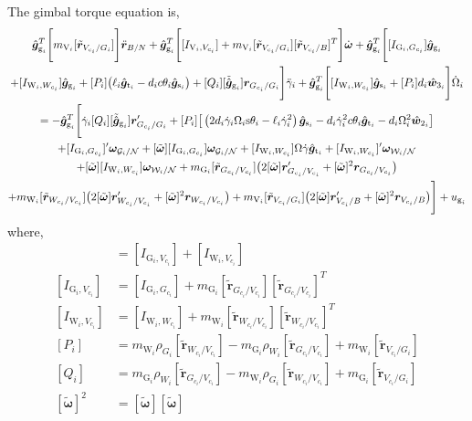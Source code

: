 The gimbal torque equation is,
\begin{multline}
\hat{\bm g}_{\text{g}_i}^T \Bigg[ m_{\text{V}_i}[\tilde{\bm r}_{V_{c_i}/G_i}] \Bigg] \ddot{\bm r}_{B/N}
+ \hat{\bm g}_{\text{g}_i}^T \Bigg[ [I_{\text{V}_i,V_{c_i}}] + m_{\text{V}_i}[\tilde{\bm r}_{V_{c_i}/G_i}][\tilde{\bm{r}}_{V_{c_i}/B}]^T \Bigg] \dot{\bm{\omega}}
+ \hat{\bm g}_{\text{g}_i}^T \Bigg[ [I_{\text{G}_i,G_{c_i}}]\hat{\bm{g}}_{\text{g}_i} \\+ [I_{\text{W}_i,W_{c_i}}]\hat{\bm{g}}_{\text{g}_i} + [P_i] \big(\ell_i\hat{\bm{g}}_{\text{t}_i} - d_ic\theta_i\hat{\bm{g}}_{\text{s}_i}\big) + [Q_i] [\tilde{\hat{\bm g}}_{\text{g}_i}]\bm{r}_{G_{c_i}/G_i} \Bigg] \ddot{\gamma}_i
+ \hat{\bm g}_{\text{g}_i}^T \Bigg[ [I_{\text{W}_i,W_{c_i}}]\hat{\bm{g}}_{\text{s}_i} + [P_i] d_i\hat{\bm w}_{3_i} \Bigg] \dot{\Omega}_i
\\ = - \hat{\bm g}_{\text{g}_i}^T \Bigg[ \dot{\gamma}_i[Q_i][\tilde{\hat{\bm g}}_{\text{g}_i}]\bm{r}'_{G_{c_i}/G_i} + [P_i] \big[\left(2d_i\dot{\gamma}_i\Omega_i\text{s}\theta_i - \ell_i\dot{\gamma}_i^2\right)\hat{\bm{g}}_{\text{s}_i} - d_i\dot{\gamma}_i^2c\theta_i\hat{\bm{g}}_{\text{t}_i} - d_i\Omega_i^2 \hat{\bm{w}}_{2_i}\big]
\\+[I_{\text{G}_i,G_{c_i}}]'\bm\omega_{\mathcal{G}_i/\cal N} + [\tilde{\bm\omega}][I_{\text{G}_i,G_{c_i}}]\bm\omega_{\mathcal{G}_i/\cal N} + [I_{\text{W}_i,W_{c_i}}]\Omega\dot{\gamma}\hat{\bm{g}}_{\text{t}_i} + [I_{\text{W}_i,W_{c_i}}]'\bm\omega_{\mathcal{W}_i/\cal N} \\+ [\tilde{\bm{\omega}}][I_{\text{W}_i,W_{c_i}}]\bm\omega_{\mathcal{W}_i/\cal N}
+ m_{\text{G}_i}[\tilde{\bm{r}}_{G_{c_i}/V_{c_i}}] \big( 2[\tilde{\bm\omega}]\bm{r}'_{G_{c_i}/V_{c_i}} + [\tilde{\bm\omega}]^2\bm{r}_{G_{c_i}/V_{c_i}}\big)
\\ + m_{\text{W}_i}[\tilde{\bm{r}}_{W_{c_i}/V_{c_i}}]\big( 2[\tilde{\bm\omega}]\bm{r}'_{W_{c_i}/V_{c_i}} + [\tilde{\bm\omega}]^2\bm{r}_{W_{c_i}/V_{c_i}}\big)
+ m_{\text{V}_i}[\tilde{\bm r}_{V_{c_i}/G_i}]\big( 2[\tilde{\bm\omega}]\bm{r}'_{V_{c_i}/B} + [\tilde{\bm\omega}]^2\bm{r}_{V_{c_i}/B} \big) \Bigg] + u_{\text{g}_i}
\label{eq:vscmgtorqueMod}
\end{multline} 
where,
\begin{align}
[I_{\text{V}_i,V_{c_i}}] &= [I_{\text{G}_i,V_{c_i}}] + [I_{\text{W}_i,V_{c_i}}]
\\
[I_{\text{G}_i,V_{c_i}}] &= [I_{\text{G}_i,G_{c_i}}] + m_{\text{G}_i}[\tilde{\bm{r}}_{G_{c_i}/V_{c_i}}][\tilde{\bm{r}}_{G_{c_i}/V_{c_i}}]^T
\\
[I_{\text{W}_i,V_{c_i}}] &= [I_{\text{W}_i,W_{c_i}}] + m_{\text{W}_i}[\tilde{\bm{r}}_{W_{c_i}/V_{c_i}}][\tilde{\bm{r}}_{W_{c_i}/V_{c_i}}]^T
\\
[P_i] &= m_{\text{W}_i}\rho_{G_i}[\tilde{\bm{r}}_{W_{c_i}/V_{c_i}}] - m_{\text{G}_i}\rho_{W_i}[\tilde{\bm{r}}_{G_{c_i}/V_{c_i}}] + m_{\text{W}_i}[\tilde{\bm r}_{V_{c_i}/G_i}]
\\
[Q_i] &= m_{\text{G}_i}\rho_{W_i}[\tilde{\bm{r}}_{G_{c_i}/V_{c_i}}] - m_{\text{W}_i}\rho_{G_i}[\tilde{\bm{r}}_{W_{c_i}/V_{c_i}}] + m_{\text{G}_i}[\tilde{\bm r}_{V_{c_i}/G_i}]
\\
[\tilde{\bm\omega}]^2 &= [\tilde{\bm\omega}][\tilde{\bm\omega}]
\end{align}

